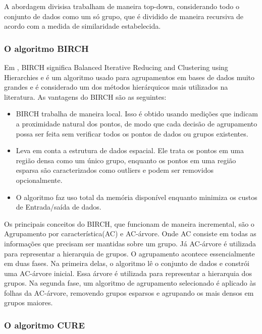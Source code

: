 A abordagem divisisa trabalham de maneira top-down, considerando todo o conjunto de dados como um só
grupo, que é dividido de maneira recursiva de acordo com a medida de similaridade
estabelecida.

\subsubsection{O algoritmo BIRCH}

Em \cite{Zhang1996}, BIRCH significa Balanced Iterative Reducing and Clustering using Hierarchies e é um algoritmo usado para agrupamentos em bases de dados muito grandes e é considerado um dos métodos hierárquicos mais utilizados na literatura. As vantagens do BIRCH são as seguintes:

\begin{itemize}
	\item BIRCH trabalha de maneira local. Isso é obtido usando medições que indicam a proximidade natural dos pontos, de modo que cada decisão de agrupamento possa ser feita sem verificar todos os pontos de dados ou grupos existentes.
	\item Leva em conta a estrutura de dados espacial. Ele trata os pontos em uma região densa como um único grupo, enquanto os pontos em uma região esparsa são caracterizados como outliers e podem ser removidos opcionalmente.
	\item O algoritmo faz uso total da memória disponível enquanto minimiza os custos de Entrada/saída de dados.
\end{itemize}

Os principais conceitos do BIRCH, que funcionam de maneira incremental, são o Agrupamento por característica(AC) e AC-árvore. Onde AC consiste em todas as informações que precisam ser mantidas sobre um grupo.
Já AC-árvore é utilizada para representar a hierarquia de grupos.
O agrupamento acontece essencialmente em duas fases. Na primeira delas, o algoritmo lê o conjunto de dados e constrói uma AC-árvore inicial.  Essa árvore é utilizada para representar a hierarquia dos grupos. Na segunda fase, um algoritmo de agrupamento selecionado é aplicado às folhas da AC-árvore, removendo grupos esparsos e agrupando os mais densos em grupos maiores.

\subsubsection{O algoritmo CURE}

